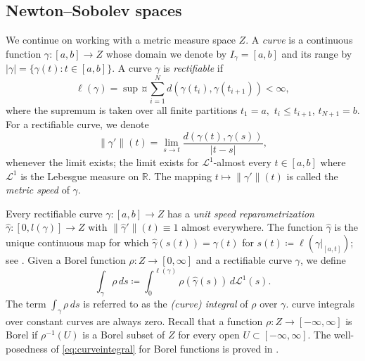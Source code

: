 \documentclass[reqno]{amsart}
\numberwithin{equation}{section}
\theoremstyle{remark}
\begin{document}
\subsection{Newton--Sobolev spaces}\label{subsec_sob}
We continue on working with a metric measure space $Z$. A \emph{curve} is a continuous function $\gamma \colon \left[a, b\right] \rightarrow Z$ whose domain we  denote by $I_{\gamma} = \left[a,b\right]$ and its range by $|\gamma|=\{\gamma(t) \colon t\in [a,b]\}$. A curve $\gamma$ is \emph{rectifiable} if
\begin{equation}
    \label{eq:rectifiable}
    \ell( \gamma )
    =
    \sup¤%
    \sum_{ i = 1 }^{ N } d( \gamma(t_i), \gamma( t_{i+1} ) )
    <
    \infty,
\end{equation}
where the supremum is taken over all finite partitions $t_1 = a,$ $t_{i} \leq t_{i+1}$, $t_{N+1} = b$. For a rectifiable curve, we denote
\begin{equation}
    \label{eq:metricspeed:pointwise}
    \| \gamma' \|(t)
    =
    \lim_{ s \rightarrow t }
        \frac{ d( \gamma(t), \gamma(s) ) }{ |t-s| },
\end{equation}
whenever the limit exists; the limit exists for $\mathcal{L}^{1}$-almost every $t \in \left[a,b\right]$ where $\mathcal{L}^{1}$ is the Lebesgue measure on $\mathbb{R}$. The mapping $t \mapsto \| \gamma' \|(t)$ is called the \emph{metric speed} of $\gamma$.


Every rectifiable curve $\gamma\colon [a, b]\to Z$ has a \emph{unit speed reparametrization} $\widehat{\gamma} \colon [0, l(\gamma)]\to Z$ with $\| \widehat{\gamma}'\|(t)  \equiv 1$ almost everywhere. The function $\widehat{\gamma}$ is the unique continuous map for which $\widehat{\gamma}( s(t) ) = \gamma( t )$ for $s(t) \coloneqq \ell( \gamma|_{ \left[a,t\right] } )$; see \cite[Eq. (5.1.6)]{HKST2015}. 
Given a Borel function $\rho \colon Z \rightarrow \left[0,\infty\right]$ and a rectifiable curve $\gamma$, we define
\begin{equation}
    \label{eq:curveintegral}
    \int_{\gamma} \rho \,ds
    \coloneqq
    \int_{ 0 }^{ \ell(\gamma) }
        \rho(\widehat{\gamma}(s))
    \,d\mathcal{L}^{1}(s).
\end{equation}
The term $\int_{\gamma} \rho \,ds$ is referred to as the \emph{(curve) integral} of $\rho$ over $\gamma$. curve integrals over constant curves are always zero. Recall that a function $\rho \colon Z \rightarrow \left[-\infty, \infty\right]$ is Borel if $\rho^{-1}( U )$ is a Borel subset of $Z$ for every open $U \subset [ -\infty, \infty ]$. The well-posedness of \eqref{eq:curveintegral} for Borel functions is proved in \cite[p. 126-127]{HKST2015}.
\end{document}
